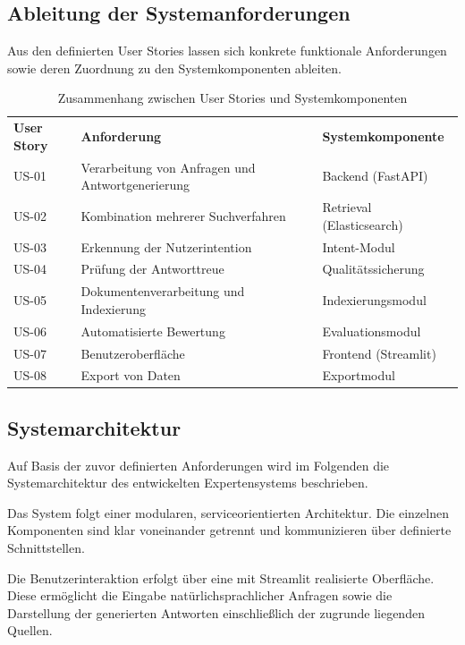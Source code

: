 \subsection{Ableitung der Systemanforderungen}

Aus den definierten User Stories lassen sich konkrete funktionale Anforderungen sowie deren Zuordnung zu den Systemkomponenten ableiten.





\begin{table}[h]
\centering
\begin{tabular}{lll}
\textbf{User Story} & \textbf{Anforderung} & \textbf{Systemkomponente} \\
US-01 & Verarbeitung von Anfragen und Antwortgenerierung & Backend (FastAPI) \\
US-02 & Kombination mehrerer Suchverfahren & Retrieval (Elasticsearch) \\
US-03 & Erkennung der Nutzerintention & Intent-Modul \\
US-04 & Prüfung der Antworttreue & Qualitätssicherung \\
US-05 & Dokumentenverarbeitung und Indexierung & Indexierungsmodul \\
US-06 & Automatisierte Bewertung & Evaluationsmodul \\
US-07 & Benutzeroberfläche & Frontend (Streamlit) \\
US-08 & Export von Daten & Exportmodul \\
\end{tabular}
\caption{Zusammenhang zwischen User Stories und Systemkomponenten}
\label{tab:user_stories}
\end{table}

\subsection{Systemarchitektur}

Auf Basis der zuvor definierten Anforderungen wird im Folgenden die Systemarchitektur des entwickelten Expertensystems beschrieben.

Das System folgt einer modularen, serviceorientierten Architektur. Die einzelnen Komponenten sind klar voneinander getrennt und kommunizieren über definierte Schnittstellen.

Die Benutzerinteraktion erfolgt über eine mit Streamlit realisierte Oberfläche. Diese ermöglicht die Eingabe natürlichsprachlicher Anfragen sowie die Darstellung der generierten Antworten einschließlich der zugrunde liegenden Quellen.

